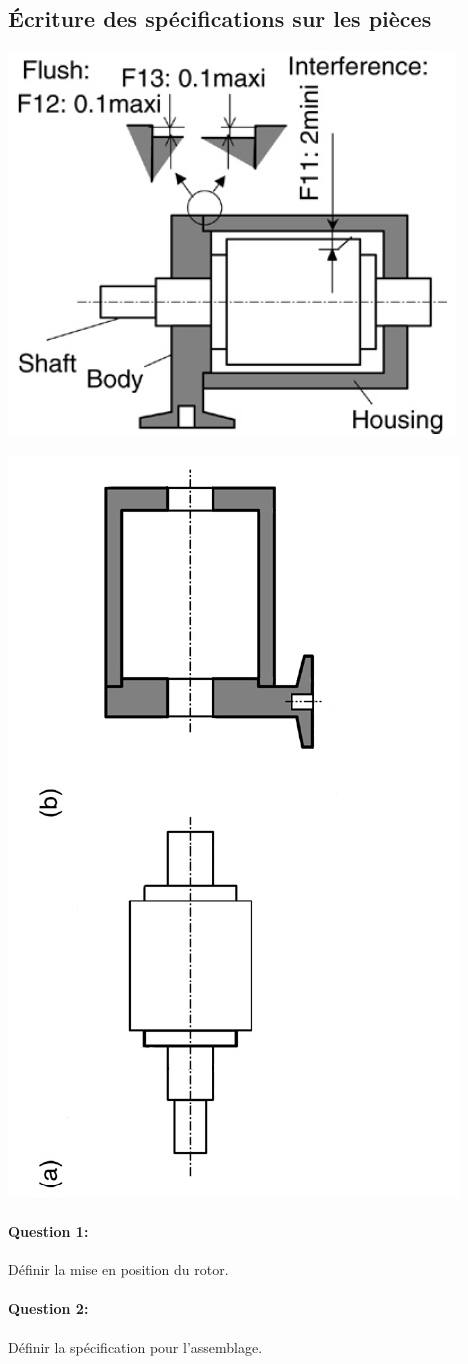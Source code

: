 \subsection{Écriture des spécifications sur les pièces}

\begin{center}
 \includegraphics[width=0.5\linewidth]{img/Moteur3.png}
\end{center}

\newpage

\begin{center}
 \includegraphics[width=0.5\linewidth,angle=270]{img/Moteur4.png}
\end{center}

\paragraph{Question 1:} Définir la mise en position du rotor.

\paragraph{Question 2:} Définir la spécification pour l'assemblage.

